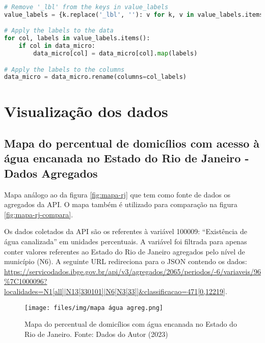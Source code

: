 \begin{apendicesenv}
\begin{lstlisting}[label={lst:read-stata},language=Python, caption=\textit{Script} de carga dos indicadores da API de países.]
# Remove '_lbl' from the keys in value_labels
value_labels = {k.replace('_lbl', ''): v for k, v in value_labels.items()}

# Apply the labels to the data
for col, labels in value_labels.items():
    if col in data_micro:
        data_micro[col] = data_micro[col].map(labels)

# Apply the labels to the columns
data_micro = data_micro.rename(columns=col_labels)
\end{lstlisting}

\chapter{Visualização dos dados}

\section{Mapa do percentual de domicílios com acesso à água encanada no Estado do Rio de Janeiro - Dados Agregados}
\label{sec-ap-img}

    Mapa análogo ao da figura \ref{fig:mapa-rj} que tem como fonte de dados os agregados da API. O mapa também é utilizado para comparação na  figura \ref{fig:mapa-rj-compara}.

    Os dados coletados da API são os referentes à variável 100009: ``Existência de água canalizada'' em unidades percentuais. A variável foi filtrada para apenas conter valores referentes ao Estado do Rio de Janeiro agregados pelo nível de município (N6). A seguinte URL redireciona para o JSON contendo os dados: \url{https://servicodados.ibge.gov.br/api/v3/agregados/2065/periodos/-6/variaveis/96%7C1000096?localidades=N1[all]|N13[330101]|N6[N3[33]]&classificacao=471[0,12219]}.

\begin{figure}[ht]
    \centering
    \texttt{[image: files/img/mapa água agreg.png]}
    \caption{Mapa do percentual de domicílios com água encanada no Estado do Rio de Janeiro. Fonte: Dados do Autor (2023)\protect\footnotemark}
    \label{fig:mapa-rj-agg}
\end{figure}


\end{apendicesenv}
